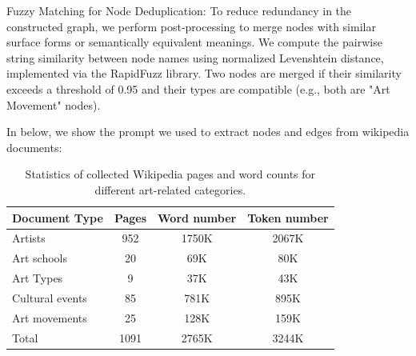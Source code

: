 \documentclass[sigconf,screen, review,anonymous]{acmart}
\begin{document}
Fuzzy Matching for Node Deduplication:
To reduce redundancy in the constructed graph, we perform post-processing to merge nodes with similar surface forms or semantically equivalent meanings. We compute the pairwise string similarity between node names using normalized Levenshtein distance, implemented via the RapidFuzz library. Two nodes are merged if their similarity exceeds a threshold of 0.95 and their types are compatible (e.g., both are "Art Movement" nodes).

In below, we show the prompt we used to extract nodes and edges from wikipedia documents:

\begin{table}[h]
    \centering
    \caption{Statistics of collected Wikipedia pages and word counts for different art-related categories.}
    \begin{tabular}{lccc}
        \toprule
         \textbf{Document Type} & \textbf{ Pages} & \textbf{Word number} & \textbf{Token number}\\
        \midrule
        Artists         & 952     & 1750K   & 2067K\\
        Art schools      & 20      & 69K     & 80K \\
        Art Types        & 9       & 37K     &  43K \\
        Cultural events & 85      & 781K    &  895K\\
        Art movements   & 25      & 128K    &  159K  \\
        \midrule
        Total           & 1091    & 2765K  & 3244K\\
        \bottomrule
    \end{tabular}

    \label{tab:wiki_stats}
\end{table}
\end{document}
